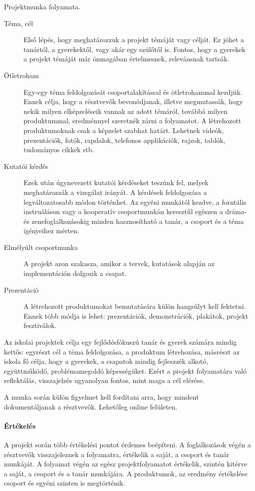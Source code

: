 Projektmunka folyamata.

\begin{description}
  \item[Téma, cél] Első lépés, hogy meghatározzuk a projekt témáját vagy célját. Ez jöhet a tanártól, a gyerekektől, vagy akár egy szülőtől is. Fontos, hogy a gyerekek a projekt témáját már önmagában értelmesnek, relevánsnak tartsák.

  \item [Ötletroham]  Egy-egy téma feldolgozását csoportalakítással és ötletrohammal kezdjük. Ennek célja, hogy a résztvevők bevonódjanak, illetve megmutassák, hogy nekik milyen elképzeléseik vannak az adott témáról, továbbá milyen produktummal, eredménnyel szeretnék zárni a folyamatot. A létrehozott produktumoknak csak a képzelet szabhat határt. Lehetnek videók, prezentációk, fotók, rapdalok, telefonos applikációk, rajzok, tablók, tudományos cikkek stb.

  \item [Kutatói kérdés] Ezek után úgynevezett kutatói kérdéseket teszünk fel, melyek meghatározzák a vizsgálat irányát. A kérdések feldolgozása a legváltozatosabb módon történhet. Az egyéni munkától kezdve, a forntális instruáláson vagy a kooperatív csoportmunkán keresztűl egészen a dráma- és zenefoglalkozásokig minden hasznosítható a tanár, a csoport és a téma igényeihez mérten.
  \item [Elmélyült csoportmunka] A projekt azon szakasza, amikor a tervek, kutatások alapján az implementáción dolgozik a csapat.
  \item [Prezentáció] A létrehozott produktumokat bemutatására külön hangsúlyt kell fektetni. Ennek több módja is lehet: prezentációk, demonstrációk, plakátok, projekt fesztiválok.
\end{description}

Az iskolai projektek célja egy fejlődésfókuszú tanár és gyerek számára mindig kettős: egyrészt cél a téma feldolgozása, a produktum létrehozása, másrészt az iskola fő célja, hogy a gyerekek, a csapatok mindig fejleszzék alkotó, együttműködő, problémamegoldó képességüket. Ezért a projekt folyamatára való reflektálás, visszajelzés ugyanolyan fontos, mint maga a cél elérése.

A munka során külön figyelmet kell fordítani arra, hogy mindent dokumentáljanak a résztvevők. Lehetőleg online felületen.
\paragraph{Értékelés} A projekt során több értékelési pontot érdemes beépíteni. A foglalkozások végén a résztvevők visszajeleznek a folyamatra, értékelik a saját, a csoport és tanár munkáját. A folyamat végén az egész projektfolyamatot értékelik, szintén kitérve a saját, a csoport és a tanár munkájára. A produktumok, az eredmény értékelése csoport és egyéni szinten is megtörténik.

